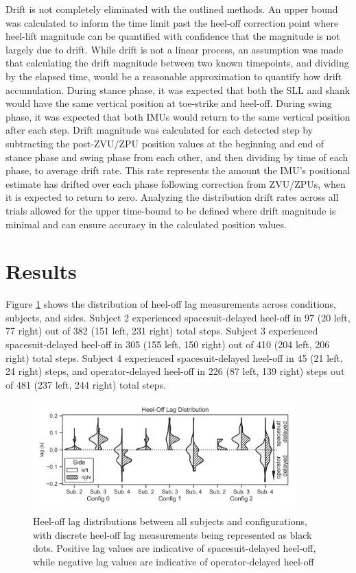 \documentclass[defaultstyle,11pt]{thesis}
\begin{document}
Drift is not completely eliminated with the outlined methods.
An upper bound was calculated to inform the time limit past the heel-off correction point where heel-lift magnitude can be quantified with confidence that the magnitude is not largely due to drift.
While drift is not a linear process, an assumption was made that calculating the drift magnitude between two known timepoints, and dividing by the elapsed time, would be a reasonable approximation to quantify how drift accumulation.
During stance phase, it was expected that both the SLL and shank would have the same vertical position at toe-strike and heel-off.
During swing phase, it was expected that both IMUs would return to the same vertical position after each step.
Drift magnitude was calculated for each detected step by subtracting the post-ZVU/ZPU position values at the beginning and end of stance phase and swing phase from each other, and then dividing by time of each phase, to average drift rate.
This rate represents the amount the IMU's positional estimate has drifted over each phase following correction from ZVU/ZPUs, when it is expected to return to zero.
Analyzing the distribution drift rates across all trials allowed for the upper time-bound to be defined where drift magnitude is minimal and can ensure accuracy in the calculated position values.

\hypertarget{results}{%
\section{Results}\label{results}}

Figure \ref{fig:SA1-Lag} shows the distribution of heel-off lag measurements across conditions, subjects, and sides.
Subject 2 experienced spacesuit-delayed heel-off in 97 (20 left, 77 right) out of 382 (151 left, 231 right) total steps.
Subject 3 experienced spacesuit-delayed heel-off in 305 (155 left, 150 right) out of 410 (204 left, 206 right) total steps.
Subject 4 experienced spacesuit-delayed heel-off in 45 (21 left, 24 right) steps, and operator-delayed heel-off in 226 (87 left, 139 right) steps out of 481 (237 left, 244 right) total steps.

\hypertarget{fig:SA1-Lag}{%
\begin{figure}
\centering
\includegraphics[width=0.9\textwidth,height=\textheight]{../fig/SA1/heelOffLag.png}
\caption[{Heel-off lag distributions between all subjects and configurations}]{Heel-off lag distributions between all subjects and configurations, with discrete heel-off lag measurements being represented as black dots. Positive lag values are indicative of spacesuit-delayed heel-off, while negative lag values are indicative of operator-delayed heel-off}
\label{fig:SA1-Lag}
\end{figure}
}
\end{document}
